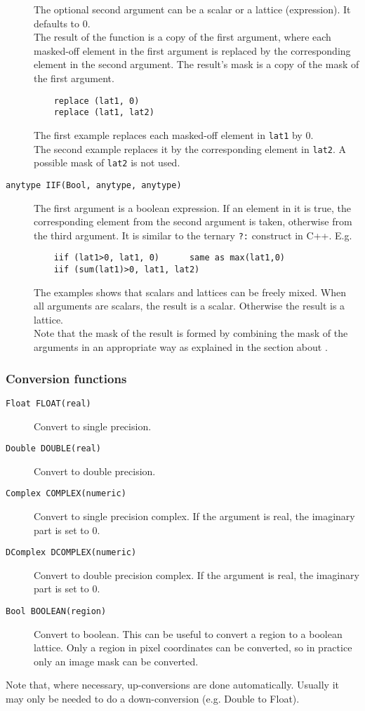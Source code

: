 \begin{description}
    The optional second argument can be a scalar or a lattice
    (expression). It defaults to 0.
    \\The result of the function is a copy of the first argument,
    where each masked-off element in the first argument is replaced by the
    corresponding element in the second argument. The result's mask is
    a copy of the mask of the first argument.
    \begin{verbatim}
    replace (lat1, 0)
    replace (lat1, lat2)
    \end{verbatim}
    The first example replaces each masked-off element in
    \texttt{lat1} by 0.
    \\The second example replaces it by the corresponding element in
    \texttt{lat2}. A possible mask of \texttt{lat2} is not used.
  \item[ \texttt{anytype IIF(Bool, anytype, anytype)}]
    The first argument is a boolean expression. If an element in
    it is true, the corresponding element from the second argument is
    taken, otherwise from the third argument. It is similar to the
    ternary \texttt{?:} construct in C++. E.g.
    \begin{verbatim}
    iif (lat1>0, lat1, 0)      same as max(lat1,0)
    iif (sum(lat1)>0, lat1, lat2)
    \end{verbatim}
    The examples shows that scalars and lattices can be freely mixed.
    When all arguments are scalars, the result is a scalar. Otherwise
    the result is a lattice.
    \\ Note that the mask of the result is formed by combining the
    mask of the arguments in an appropriate way as explained in the
    section about .
\end{description}

\subsubsection{Conversion functions}
\begin{description}
  \item[ \texttt{Float FLOAT(real)}]
    Convert to single precision.
  \item[ \texttt{Double DOUBLE(real)}]
    Convert to double precision.
  \item[ \texttt{Complex COMPLEX(numeric)}]
    Convert to single precision complex.
    If the argument is real, the imaginary part is set to 0.
  \item[ \texttt{DComplex DCOMPLEX(numeric)}]
    Convert to double precision complex.
    If the argument is real, the imaginary part is set to 0.
  \item[ \texttt{Bool BOOLEAN(region)}]
    Convert to boolean.
    This can be useful to convert a region to a boolean lattice.
    Only a region in pixel coordinates can be converted, so in
    practice only an image mask can be converted.
\end{description}
Note that, where necessary, up-conversions are done automatically.
Usually it may only be needed to do a down-conversion (e.g. Double to Float).

